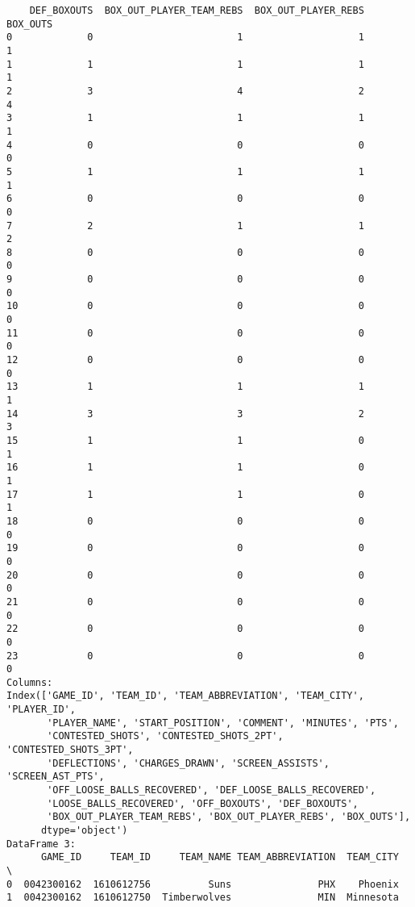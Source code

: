 \begin{verbatim}
    DEF_BOXOUTS  BOX_OUT_PLAYER_TEAM_REBS  BOX_OUT_PLAYER_REBS  BOX_OUTS  
0             0                         1                    1         1  
1             1                         1                    1         1  
2             3                         4                    2         4  
3             1                         1                    1         1  
4             0                         0                    0         0  
5             1                         1                    1         1  
6             0                         0                    0         0  
7             2                         1                    1         2  
8             0                         0                    0         0  
9             0                         0                    0         0  
10            0                         0                    0         0  
11            0                         0                    0         0  
12            0                         0                    0         0  
13            1                         1                    1         1  
14            3                         3                    2         3  
15            1                         1                    0         1  
16            1                         1                    0         1  
17            1                         1                    0         1  
18            0                         0                    0         0  
19            0                         0                    0         0  
20            0                         0                    0         0  
21            0                         0                    0         0  
22            0                         0                    0         0  
23            0                         0                    0         0  
Columns:
Index(['GAME_ID', 'TEAM_ID', 'TEAM_ABBREVIATION', 'TEAM_CITY', 'PLAYER_ID',
       'PLAYER_NAME', 'START_POSITION', 'COMMENT', 'MINUTES', 'PTS',
       'CONTESTED_SHOTS', 'CONTESTED_SHOTS_2PT', 'CONTESTED_SHOTS_3PT',
       'DEFLECTIONS', 'CHARGES_DRAWN', 'SCREEN_ASSISTS', 'SCREEN_AST_PTS',
       'OFF_LOOSE_BALLS_RECOVERED', 'DEF_LOOSE_BALLS_RECOVERED',
       'LOOSE_BALLS_RECOVERED', 'OFF_BOXOUTS', 'DEF_BOXOUTS',
       'BOX_OUT_PLAYER_TEAM_REBS', 'BOX_OUT_PLAYER_REBS', 'BOX_OUTS'],
      dtype='object')
DataFrame 3:
      GAME_ID     TEAM_ID     TEAM_NAME TEAM_ABBREVIATION  TEAM_CITY  \
0  0042300162  1610612756          Suns               PHX    Phoenix   
1  0042300162  1610612750  Timberwolves               MIN  Minnesota   


\end{verbatim}
